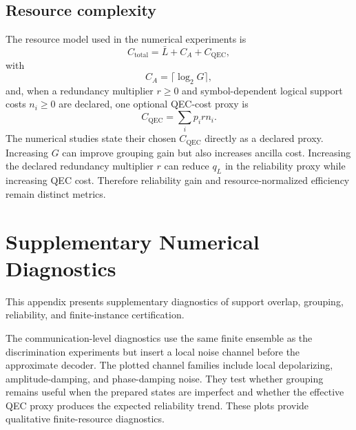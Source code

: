 \documentclass[
 reprint,
 amsmath,amssymb,
 aps,
 pra,
 floatfix,
]{revtex4-2}
\begin{document}
\subsection{Resource complexity}

The resource model used in the numerical experiments is
\begin{equation}
    C_{\mathrm{total}}=\bar L+C_A+C_{\mathrm{QEC}},
\end{equation}
with
\begin{equation}
    C_A=\lceil\log_2G\rceil,
\end{equation}
and, when a redundancy multiplier \(r\geq0\) and symbol-dependent logical support costs \(n_i\geq0\) are declared, one optional QEC-cost proxy is
\begin{equation}
    C_{\mathrm{QEC}}=\sum_ip_irn_i.
\end{equation}
The numerical studies state their chosen \(C_{\mathrm{QEC}}\) directly as a declared proxy. Increasing $G$ can improve grouping gain but also increases ancilla cost. Increasing the declared redundancy multiplier $r$ can reduce $q_L$ in the reliability proxy while increasing QEC cost. Therefore reliability gain and resource-normalized efficiency remain distinct metrics.

\FloatBarrier
\section{Supplementary Numerical Diagnostics}
\label{app:supplementary_diagnostics}
\setcounter{figure}{0}
\setcounter{table}{0}

This appendix presents supplementary diagnostics of support overlap, grouping, reliability, and finite-instance certification.

The communication-level diagnostics use the same finite ensemble as the discrimination experiments but insert a local noise channel before the approximate decoder. The plotted channel families include local depolarizing, amplitude-damping, and phase-damping noise. They test whether grouping remains useful when the prepared states are imperfect and whether the effective QEC proxy produces the expected reliability trend. These plots provide qualitative finite-resource diagnostics.
\end{document}
